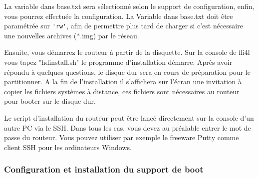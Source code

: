     La variable  dans base.txt sera sélectionné selon le
    support de configuration, enfin, vous pourrez effectuée la configuration.
    La Variable  dans base.txt doit être paramétrée sur \verb*?'rw'?,
    afin de permettre plus tard de charger si c'est nécessaire une nouvelles
    archives (*.img) par le réseau.

    Ensuite, vous démarrez le routeur à partir de la disquette. Sur la console de
    fli4l vous tapez "hdinstall.sh" le programme d'installation démarre. Après
    avoir répondu à quelques questions, le disque dur sera en cours de préparation
    pour le partitionner. A la fin de l'installation il s'affichera sur l'écran
    une invitation à copier les fichiers systèmes à distance, ces fichiers sont
    nécessaires au routeur pour booter sur le disque dur.


    Le script d’installation du routeur peut être lancé directement sur la
    console d'un autre PC via le SSH. Dans tous les cas, vous devez au préalable
    entrer le mot de passe du routeur. Vous pouvez utiliser par exemple le
    freeware Putty comme client SSH pour les ordinateurs Windows.

\subsubsection{Configuration et installation du support de boot}

